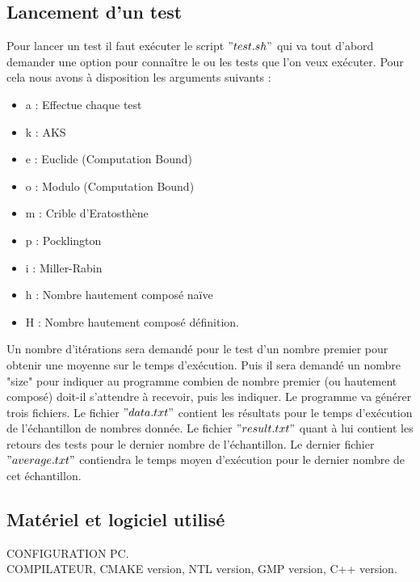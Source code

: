 		\subsection{Lancement d'un test}
	Pour lancer un test il faut exécuter le script $"test.sh"$ qui va tout d'abord demander une option pour connaître le ou les tests que l'on veux exécuter. Pour cela nous avons à disposition les arguments suivants : 
	\begin{itemize}
		\item a : Effectue chaque test
		\item k : AKS
		\item e : Euclide (Computation Bound)
		\item o : Modulo (Computation Bound)
		\item m : Crible d'Eratosthène
		\item p : Pocklington
		\item i : Miller-Rabin
		\item h : Nombre hautement composé naïve
		\item H : Nombre hautement composé définition.
	\end{itemize}
	
Un nombre d'itérations sera demandé pour le test d'un nombre premier pour obtenir une moyenne sur le temps d'exécution. Puis il sera demandé un nombre "size" pour indiquer au programme combien de nombre premier (ou hautement composé) doit-il s'attendre à recevoir, puis les indiquer. Le programme va générer trois fichiers. Le fichier $"data.txt"$ contient les résultats pour le temps d'exécution de l'échantillon de nombres donnée. Le fichier $"result.txt"$ quant à lui contient les retours des tests pour le dernier nombre de l'échantillon. Le dernier fichier $"average.txt"$ contiendra le temps moyen d'exécution pour le dernier nombre de cet échantillon.
		\subsection{Matériel et logiciel utilisé}
			CONFIGURATION PC.\\
			COMPILATEUR, CMAKE version, NTL version, GMP version, C++ version.
	

